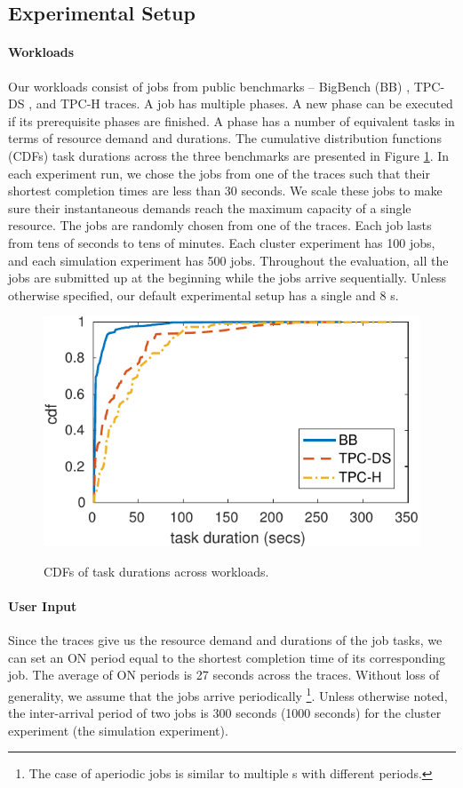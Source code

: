 \subsection{Experimental Setup}

\paragraph{Workloads} Our workloads consist of jobs from public benchmarks -- BigBench (BB) \cite{bbench}, TPC-DS \cite{tpc-ds}, and TPC-H \cite{tpc-h} traces.
A job has multiple phases.
A new phase can be executed if its prerequisite phases are finished.
A phase has a number of equivalent tasks in terms of resource demand and durations.
The cumulative distribution functions (CDFs) task durations across the three benchmarks are presented in Figure \ref{fig:worklad_cdf}.
In each experiment run, we chose the \burstq jobs from one of the traces such that their shortest completion times are less than 30 seconds.
We scale these jobs to make sure their instantaneous demands reach the maximum capacity of a single resource. The \batchq jobs are randomly chosen from one of the traces.
Each \batchq job lasts from tens of seconds to tens of minutes.
Each cluster experiment has 100 \batchq jobs, and each simulation experiment has 500 \batchq jobs.
Throughout the evaluation, all the \batchq jobs are submitted up at the beginning while the \burstq jobs arrive sequentially.
Unless otherwise specified, our default experimental setup has a single \burstq and 8 {\batchq}s.

\begin{figure}[!ht]
	\centering	
	{\includegraphics[width=0.8\linewidth]{fig/cdf}}
	\caption{CDFs of task durations across workloads.}
	\label{fig:worklad_cdf}
\end{figure}

\paragraph{User Input} Since the traces give us the resource demand and durations of the job tasks, we can set an ON period equal to the shortest completion time of its corresponding \burstq job.
The average of ON periods is 27 seconds across the traces.
Without loss of generality, we assume that the \burstq jobs arrive periodically
\footnote{The case of aperiodic \burstq jobs is similar to multiple {\burstq}s with different periods.}.
Unless otherwise noted, the inter-arrival period of two \burstq jobs is 300 seconds (1000 seconds) for the cluster experiment (the simulation experiment).

